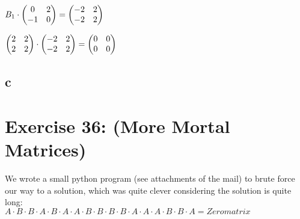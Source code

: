 \documentclass[12pt]{article}
\begin{document}
$B_1 \cdot 
\begin{pmatrix}
0 & 2 \\
-1 & 0 
\end{pmatrix} = 
\begin{pmatrix}
-2 & 2 \\
-2 & 2 
\end{pmatrix}\\
$ 

$
\begin{pmatrix}
2 & 2 \\
2 & 2 
\end{pmatrix} \cdot
\begin{pmatrix}
-2 & 2 \\
-2 & 2 
\end{pmatrix} =
\begin{pmatrix}
0 & 0 \\
0 & 0 
\end{pmatrix}\\
$

\subsection*{c}




\section*{Exercise 36: (More Mortal Matrices)}

We wrote a small python program (see attachments of the mail) to brute force our way to a solution, which was quite clever considering the solution is quite long:\\
$A \cdot B \cdot B \cdot A \cdot B \cdot A \cdot A \cdot B \cdot B \cdot B \cdot B \cdot A \cdot A \cdot A \cdot B \cdot B \cdot A = Zeromatrix$


\end{document}
